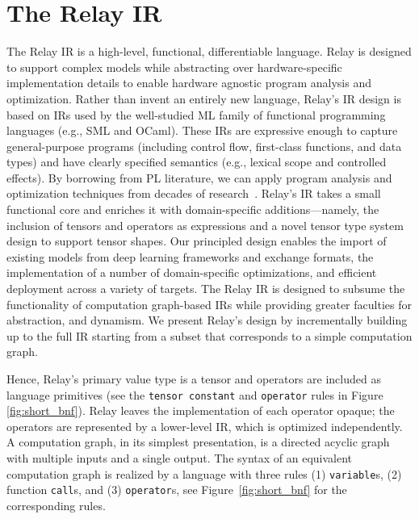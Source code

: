 \section{The Relay IR}



The Relay IR is a high-level, functional, differentiable language.
Relay is designed to support
  complex models while abstracting over hardware-specific
  implementation details to enable hardware agnostic program
  analysis and optimization.
Rather than invent an entirely new language,
  Relay's IR design is based on IRs used by the well-studied ML family of
  functional programming languages (e.g., SML and OCaml).
These IRs are expressive enough to capture general-purpose programs
  (including control flow, first-class functions, and data types)
  and have clearly specified semantics (e.g., lexical scope and controlled effects).
By borrowing from PL literature,
  we can apply program analysis and optimization techniques from decades of research~\citep{haskell_vector}.
Relay's IR takes a small functional core and enriches it with domain-specific additions---namely,
  the inclusion of tensors and operators as expressions
  and a novel tensor type system design to support tensor shapes.
Our principled design
  enables the import of existing models from deep learning frameworks and exchange formats,
  the implementation of a number of domain-specific optimizations,
  and efficient deployment across a variety of targets.
The Relay IR is designed
  to subsume the functionality of computation graph-based IRs
  while providing greater faculties for abstraction, and dynamism.
We present Relay's design by incrementally building up to the full IR
  starting from a subset that corresponds to a simple computation graph.

Hence, Relay's primary value type is a tensor and operators are included as language primitives
  (see the \verb|tensor constant| and \verb|operator| rules in Figure \ref{fig:short_bnf}).
Relay leaves the implementation of each operator opaque; the operators
  are represented by a lower-level IR, which is optimized independently.
A computation graph, in its simplest presentation, is a directed acyclic
  graph with multiple inputs and a single output.
The syntax of an equivalent computation graph is realized by
  a language with three rules (1) \verb|variable|s, (2) function \verb|call|s,
  and (3) \verb|operator|s, see Figure~\ref{fig:short_bnf} for the corresponding rules.

